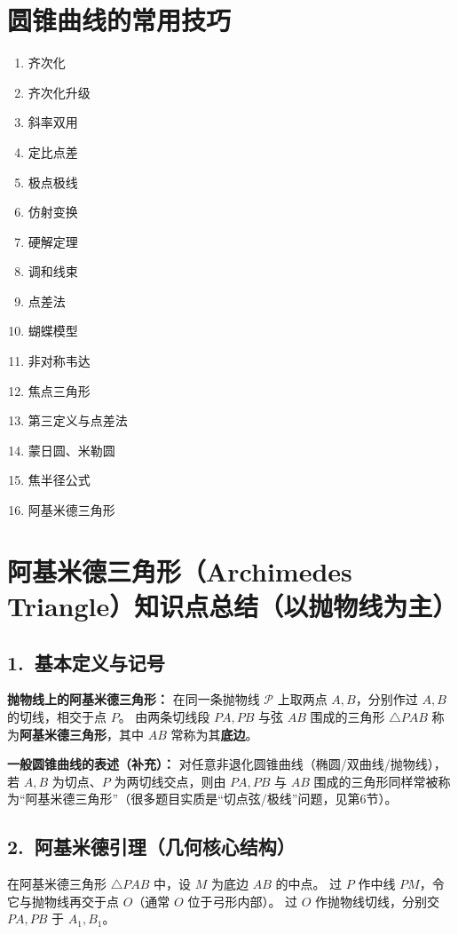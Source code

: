 \documentclass{ctexart}
\begin{document}
	\section{圆锥曲线的常用技巧}
	\begin{enumerate}
		\item 齐次化
		\item 齐次化升级
		\item 斜率双用
		\item 定比点差
		\item 极点极线
		\item 仿射变换
		\item 硬解定理
		\item 调和线束
		\item 点差法
		\item 蝴蝶模型
		\item 非对称韦达
		\item 焦点三角形
		\item 第三定义与点差法
		\item 蒙日圆、米勒圆
		\item 焦半径公式
		\item 阿基米德三角形
		
	\end{enumerate}


	\section*{阿基米德三角形（Archimedes Triangle）知识点总结（以抛物线为主）}
	
	\subsection*{1.\ 基本定义与记号}
	\textbf{抛物线上的阿基米德三角形：}
	在同一条抛物线 $\mathcal P$ 上取两点 $A,B$，分别作过 $A,B$ 的切线，相交于点 $P$。
	由两条切线段 $PA,PB$ 与弦 $AB$ 围成的三角形 $\triangle PAB$ 称为\textbf{阿基米德三角形}，其中 $AB$ 常称为其\textbf{底边}。
	
	\textbf{一般圆锥曲线的表述（补充）：}
	对任意非退化圆锥曲线（椭圆/双曲线/抛物线），若 $A,B$ 为切点、$P$ 为两切线交点，则由 $PA,PB$ 与 $AB$ 围成的三角形同样常被称为“阿基米德三角形”（很多题目实质是“切点弦/极线”问题，见第6节）。
	
	\subsection*{2.\ 阿基米德引理（几何核心结构）}
	在阿基米德三角形 $\triangle PAB$ 中，设 $M$ 为底边 $AB$ 的中点。
	过 $P$ 作中线 $PM$，令它与抛物线再交于点 $O$（通常 $O$ 位于弓形内部）。
	过 $O$ 作抛物线切线，分别交 $PA,PB$ 于 $A_1,B_1$。
	
\end{document}

